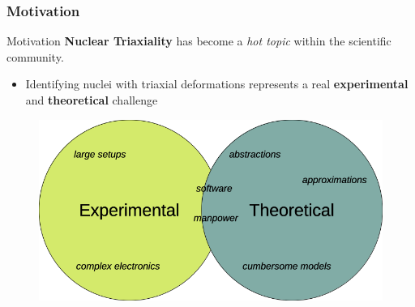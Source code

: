 \documentclass{beamer}
\begin{document}
\begin{frame}
	\frametitle{Motivation}
    \vspace{-0.5cm}
	\begin{block}{Motivation}
		\textbf{Nuclear Triaxiality} has become a \emph{hot topic} within the scientific community.
		\begin{itemize}
			\item Identifying nuclei with triaxial deformations represents a real \textbf{experimental} and \textbf{theoretical} challenge
		\end{itemize}
	\end{block}
    \vspace{-0.3cm}
    \begin{figure}
        \centering
        \includegraphics[scale=0.3]{figures/exp_vs_theory.png}
    \end{figure}
\end{frame}
\end{document}
